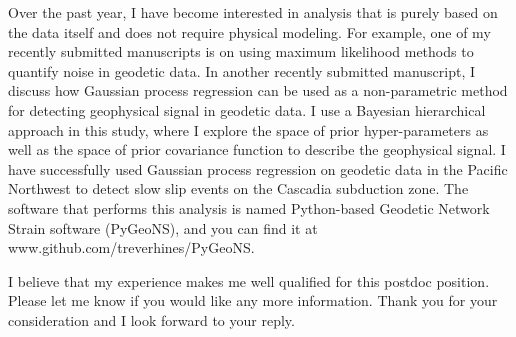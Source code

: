 \documentclass[11pt,a4paper,sans]{moderncv}
\begin{document}
Over the past year, I have become interested in analysis that is purely based on the data itself and does not require physical modeling. For example, one of my recently submitted manuscripts is on using maximum likelihood methods to quantify noise in geodetic data. In another recently submitted manuscript, I discuss how Gaussian process regression can be used as a non-parametric method for detecting geophysical signal in geodetic data. I use a Bayesian hierarchical approach in this study, where I explore the space of prior hyper-parameters as well as the space of prior covariance function to describe the geophysical signal. I have successfully used Gaussian process regression on geodetic data in the Pacific Northwest to detect slow slip events on the Cascadia subduction zone. The software that performs this analysis is named Python-based Geodetic Network Strain software (PyGeoNS), and you can find it at www.github.com/treverhines/PyGeoNS.   

I believe that my experience makes me well qualified for this postdoc position. Please let me know if you would like any more information. Thank you for your consideration and I look forward to your reply.                                              

\makeletterclosing
\end{document}
